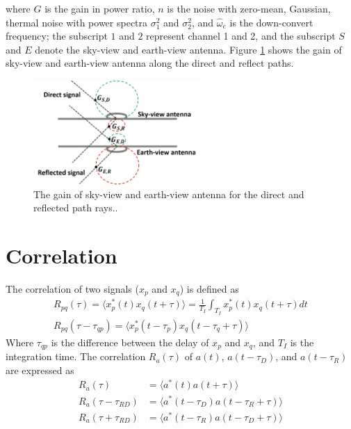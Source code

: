 \documentclass[draftcls,onecolumn]{IEEEtran}  %
\begin{document}
where $G$ is the gain in power ratio, $n$ is the noise with zero-mean, Gaussian, thermal noise with power spectra $\sigma^2_1$ and $\sigma^2_2$, and $\hat{\omega}_e$ is the down-convert frequency; the subscript $1$ and $2$ represent channel 1 and 2, and the subscript $S$ and $E$ denote the sky-view and earth-view antenna. Figure \ref{fig:ant_gain} shows the gain of sky-view and earth-view antenna along the direct and reflect paths.
\begin{figure}[t!]
	\centering
	\includegraphics[width=2.5in]{pdf/ant_gain.jpg}
	\caption{The gain of sky-view and earth-view antenna for the direct and reflected path rays..}
	\centering
	\label{fig:ant_gain}
\end{figure}

\section{Correlation}

The correlation of two signals ($x_p$ and $x_q$) is defined as
\begin{eqnarray}
	R_{pq}(\tau)  = \langle x_p^*(t)x_q(t+\tau)\rangle=\frac{1}{T_I} \int_{T_I}x_p^*(t) x_q(t+\tau)dt \\ 
    R_{pq}(\tau-\tau_{qp}) =\langle x_p^*(t-\tau_p)x_q(t-\tau_q +\tau)\rangle
    \label{Eq: correlation_def}
\end{eqnarray}
Where $\tau_{qp}$ is the difference between the delay of $x_p$ and $x_q$, and $T_I$ is the integration time. The correlation $R_a(\tau)$ of $a(t)$, $a(t-\tau_D)$, and $a(t-\tau_R)$ are expressed as
\begin{equation}
\begin{split}
	R_a(\tau)&=\langle a^*(t)a(t +\tau)\rangle \\
    R_a(\tau-\tau_{RD})&=\langle a^*(t-\tau_D)a(t -\tau_R+\tau)\rangle \\
    R_a(\tau+\tau_{RD})&=\langle a^*(t-\tau_R)a(t -\tau_D+\tau)\rangle \\
 \end{split}
\end{equation}
\end{document}
